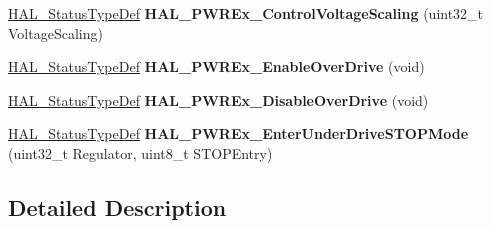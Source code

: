 \begin{DoxyCompactItemize}
\item 
\hyperlink{stm32f4xx__hal__def_8h_a63c0679d1cb8b8c684fbb0632743478f}{H\+A\+L\+\_\+\+Status\+Type\+Def} {\bfseries H\+A\+L\+\_\+\+P\+W\+R\+Ex\+\_\+\+Control\+Voltage\+Scaling} (uint32\+\_\+t Voltage\+Scaling)\hypertarget{group___p_w_r_ex___exported___functions___group1_ga1a1e616641c2dc696681ace585d9afb5}{}\label{group___p_w_r_ex___exported___functions___group1_ga1a1e616641c2dc696681ace585d9afb5}

\item 
\hyperlink{stm32f4xx__hal__def_8h_a63c0679d1cb8b8c684fbb0632743478f}{H\+A\+L\+\_\+\+Status\+Type\+Def} {\bfseries H\+A\+L\+\_\+\+P\+W\+R\+Ex\+\_\+\+Enable\+Over\+Drive} (void)\hypertarget{group___p_w_r_ex___exported___functions___group1_gaaf092495bffd53ad2fe6a91f90f87032}{}\label{group___p_w_r_ex___exported___functions___group1_gaaf092495bffd53ad2fe6a91f90f87032}

\item 
\hyperlink{stm32f4xx__hal__def_8h_a63c0679d1cb8b8c684fbb0632743478f}{H\+A\+L\+\_\+\+Status\+Type\+Def} {\bfseries H\+A\+L\+\_\+\+P\+W\+R\+Ex\+\_\+\+Disable\+Over\+Drive} (void)\hypertarget{group___p_w_r_ex___exported___functions___group1_ga6f554749076c25dfc33b9cebb0408780}{}\label{group___p_w_r_ex___exported___functions___group1_ga6f554749076c25dfc33b9cebb0408780}

\item 
\hyperlink{stm32f4xx__hal__def_8h_a63c0679d1cb8b8c684fbb0632743478f}{H\+A\+L\+\_\+\+Status\+Type\+Def} {\bfseries H\+A\+L\+\_\+\+P\+W\+R\+Ex\+\_\+\+Enter\+Under\+Drive\+S\+T\+O\+P\+Mode} (uint32\+\_\+t Regulator, uint8\+\_\+t S\+T\+O\+P\+Entry)\hypertarget{group___p_w_r_ex___exported___functions___group1_ga46be5e3415921800ca13015da2a0b301}{}\label{group___p_w_r_ex___exported___functions___group1_ga46be5e3415921800ca13015da2a0b301}

\end{DoxyCompactItemize}


\subsection{Detailed Description}

